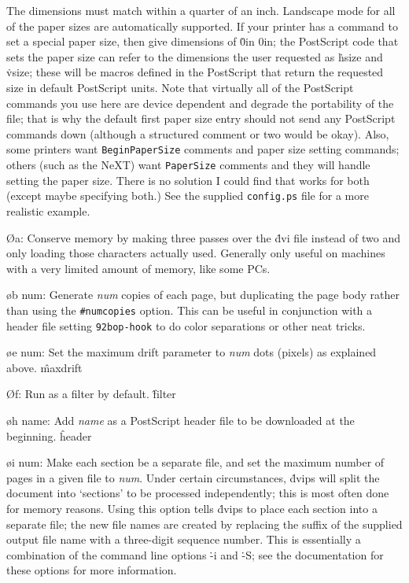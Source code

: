 {The dimensions must match
within a quarter of an inch.  Landscape mode for all of the paper sizes
are automatically supported.  If your printer has a command to set a
special paper size, then give dimensions of \.{0in 0in}; the PostScript
code that sets the paper size can refer to the dimensions the user
requested as \.{hsize} and \.{vsize}; these will be macros defined in
the PostScript that return the requested size in default PostScript
units.  Note that virtually all of the PostScript commands you use
here are device dependent and degrade the portability of the file; that
is why the default first paper size entry should not send any PostScript
commands down (although a structured comment or two would be okay).
Also, some printers want {\tt BeginPaperSize} comments and paper size
setting commands; others (such as the NeXT) want {\tt PaperSize} comments
and they will handle setting the paper size.  There is no solution I
could find that works for both (except maybe specifying both.)
See the supplied {\tt config.ps} file for a more realistic
example.

\O a:  Conserve memory by making three passes over the \.{dvi} file
instead of two and only loading those characters actually used.
Generally only useful on machines with a very limited amount of
memory, like some PCs.

\o b num: Generate {\it num} copies of each page, but duplicating the
page body rather than using the {\tt\#numcopies} option.  This can be
useful in conjunction with a header file setting {\tt\char92bop-hook}
to do color separations or other neat tricks.

\o e num:
Set the maximum drift parameter to {\it num} dots (pixels) as explained above.
\^{maxdrift}

\O f:  Run as a filter by default.
\^{filter}

\o h name:
Add {\it name} as a PostScript header file to be downloaded at the beginning.
\^{header}

\o i num:
Make each section be a separate file, and set the maximum number of pages
in a given file to {\it num}.  Under certain circumstances,
\.{dvips} will split the document into `sections' to be processed
independently; this is most often done for memory reasons.  Using this
option tells \.{dvips} to place each section into a separate file; the
new file names are created by replacing the suffix of the supplied output
file name with a three-digit sequence number.
This is essentially a combination of the
command line options \.{-i} and \.{-S}; see the documentation for these
options for more information.

}
